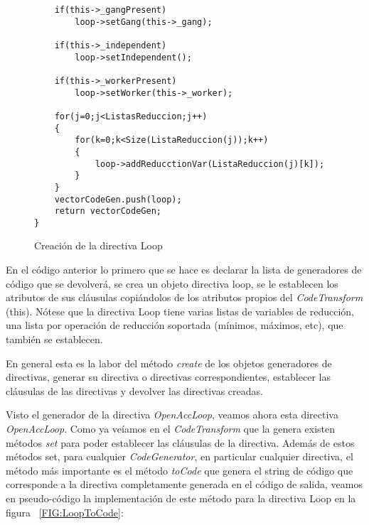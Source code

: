 \begin{itemize}
\begin{figure}[t]
\begin{lstlisting}
	if(this->_gangPresent)
		loop->setGang(this->_gang);

	if(this->_independent)
		loop->setIndependent();
	
	if(this->_workerPresent)
		loop->setWorker(this->_worker);

	for(j=0;j<ListasReduccion;j++)
	{
		for(k=0;k<Size(ListaReduccion(j));k++)
		{
			loop->addReducctionVar(ListaReduccion(j)[k]);
		}
	}
	vectorCodeGen.push(loop);
	return vectorCodeGen;
}

\end{lstlisting}
\caption{Creación de la directiva Loop}
\label{FIG:LoopCreation}
\end{figure}

En el código anterior lo primero que se hace es declarar la lista de generadores de código que se devolverá, se crea un objeto directiva loop, se le establecen los atributos de sus cláusulas copiándolos de los atributos propios del \textit{CodeTransform} (this). Nótese que la directiva Loop tiene varias listas de variables de reducción, una lista por operación de reducción soportada (mínimos, máximos, etc), que también se establecen.

En general esta es la labor del método \textit{create} de los objetos generadores de directivas, generar su directiva o directivas correspondientes, establecer las cláusulas de las directivas y devolver las directivas creadas.


\end{itemize}


Visto el generador de la directiva \textit{OpenAccLoop}, veamos ahora esta directiva \textit{OpenAccLoop}. Como ya veíamos en el \textit{CodeTransform} que la genera existen métodos \textit{set} para poder establecer las cláusulas de la directiva. Además de estos métodos set, para cualquier \textit{CodeGenerator}, en particular cualquier directiva, el método más importante es el método \textit{toCode} que genera el string de código que corresponde a la directiva completamente generada en el código de salida, veamos en pseudo-código la implementación de este método para la directiva Loop en la figura ~\ref{FIG:LoopToCode}:
\newpage


